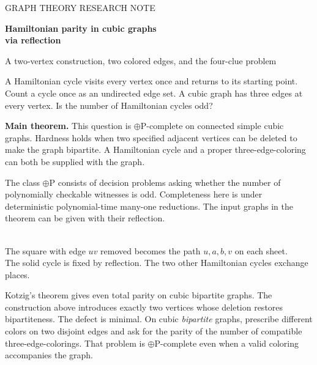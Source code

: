 \documentclass[11pt,letterpaper]{article}
\newcommand{\hd}[1]{\par\medskip{\large\bfseries\color{pine}#1}\par\nobreak}
\newcommand{\boxline}[1]{\par\smallskip\noindent\colorbox{pale}{\parbox{\dimexpr\linewidth-2\fboxsep\relax}{\vspace{4pt}#1\vspace{4pt}}}\par\smallskip}
\newcommand{\classpar}{\mathord{\oplus}\mathrm P}
\begin{document}
{\sffamily\small\color{slate} GRAPH THEORY \hfill RESEARCH NOTE}\\[5pt]
{\fontsize{24.88}{30}\selectfont\bfseries\color{ink} Hamiltonian parity in cubic graphs\\[2pt] via reflection\par}
\vspace{3pt}
{\large\color{slate} A two-vertex construction, two colored edges, and the four-clue problem\par}
\medskip
A Hamiltonian cycle visits every vertex once and returns to its starting point. Count a cycle once as an undirected edge set. A cubic graph has three edges at every vertex. Is the number of Hamiltonian cycles odd?

\boxline{\textbf{Main theorem.} This question is $\classpar$-complete on connected simple cubic graphs. Hardness holds when two specified adjacent vertices can be deleted to make the graph bipartite. A Hamiltonian cycle and a proper three-edge-coloring can both be supplied with the graph.}

The class $\classpar$ consists of decision problems asking whether the number of polynomially checkable witnesses is odd. Completeness here is under deterministic polynomial-time many-one reductions. The input graphs in the theorem can be given with their reflection.

\begin{center}
\\[3pt]
{\footnotesize\color{slate} The square with edge $uv$ removed becomes the path $u,a,b,v$ on each sheet.}\\[-1pt]
{\footnotesize\color{slate} The solid cycle is fixed by reflection. The two other Hamiltonian cycles exchange places.}
\end{center}
\hd{Why two vertices matter}
Kotzig's theorem gives even total parity on cubic bipartite graphs. The construction above introduces exactly two vertices whose deletion restores bipartiteness. The defect is minimal. On cubic \emph{bipartite} graphs, prescribe different colors on two disjoint edges and ask for the parity of the number of compatible three-edge-colorings. That problem is $\classpar$-complete even when a valid coloring accompanies the graph.
\end{document}
